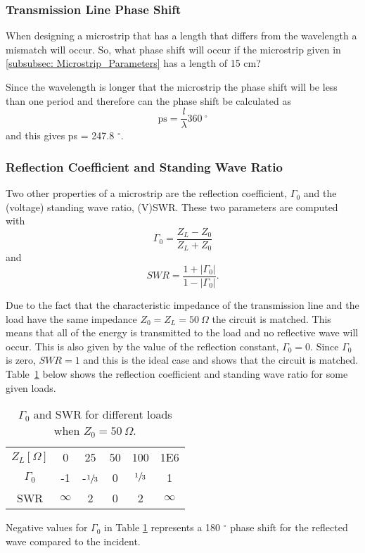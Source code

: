 \documentclass[report.tex]{subfiles}
\begin{document}
\subsubsection{Transmission Line Phase Shift}\label{subsubsec: Lab1 Phase Shift}
When designing a microstrip that has a length that differs from the wavelength a mismatch will occur. So, what phase shift will occur if the microstrip given in \ref{subsubsec: Microstrip_Parameters} has a length of 15 cm?

Since the wavelength is longer that the microstrip the phase shift will be less than one period and therefore can the phase shift be calculated as
\begin{equation}
	\text{ps} = \dfrac{l}{\lambda} 360 \:^\circ
\end{equation}
and this gives ps = 247.8 $^\circ$.
\subsubsection{Reflection Coefficient and Standing Wave Ratio}\label{subsec:Lab1 RC and SWR}
Two other properties of a microstrip are the reflection coefficient, $\Gamma_0$ and the (voltage) standing wave ratio, (V)SWR. These two parameters are computed with
\begin{equation}
	\Gamma_0 = \dfrac{Z_L - Z_0}{Z_L + Z_0}
\end{equation}
and
\begin{equation}
	SWR = \dfrac{1 + \left|\Gamma_0\right|}{1 - \left|\Gamma_0\right|}\text{.}
\end{equation}

Due to the fact that the characteristic impedance of the transmission line and the load have the same impedance $Z_0 = Z_L = 50\:\Omega$ the circuit is matched. This means that all of the energy is transmitted to the load and no reflective wave will occur. This is also given by the value of the reflection constant, $\Gamma_0 = 0$. Since $\Gamma_0$ is zero, $SWR = 1$ and this is the ideal case and shows that the circuit is matched. Table~\ref{table: RC and SWR} below shows the reflection coefficient and standing wave ratio for some given loads.

\begin{table}[h]
    \centering
    \caption{$\Gamma_0$ and SWR for different loads when $Z_0= 50\: \Omega$.}
    \begin{tabular}{c | c c c c c}
         $Z_L [\Omega]$ & 0 & 25 & 50 & 100 & 1E6 \\
         $\Gamma_0$ & -1 & -$\sfrac{1}{3}$ & 0 & $\sfrac{1}{3}$ & 1 \\
         SWR & $\infty$ & 2 & 0 & 2 & $\infty$
    \end{tabular}\label{table: RC and SWR}
\end{table}

Negative values for $\Gamma_0$ in Table \ref{table: RC and SWR} represents a 180 $^\circ$ phase shift for the reflected wave compared to the incident.
\end{document}
